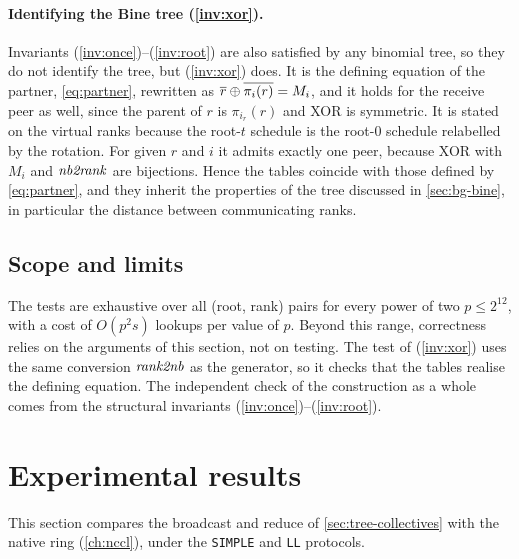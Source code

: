 \paragraph{Identifying the Bine tree (\ref{inv:xor}).}
Invariants (\ref{inv:once})--(\ref{inv:root}) are also satisfied by any binomial tree, so they do not identify the \bine{} tree, but (\ref{inv:xor}) does.
It is the defining equation of the partner, \cref{eq:partner}, rewritten as $\overline{r}\oplus\overline{\pi_i(r)}=M_i$, and it holds for the receive peer as well, since the parent of $r$ is $\pi_{i_r}(r)$ and XOR is symmetric.
It is stated on the virtual ranks because the root-$t$ schedule is the root-$0$ schedule relabelled by the rotation.
For given $r$ and $i$ it admits exactly one peer, because XOR with $M_i$ and $\mathit{nb2rank}$ are bijections.
Hence the tables coincide with those defined by \cref{eq:partner}, and they inherit the properties of the \bine{} tree discussed in \cref{sec:bg-bine}, in particular the distance between communicating ranks.

\subsection{Scope and limits}

The tests are exhaustive over all (root, rank) pairs for every power of two $p\le 2^{12}$, with a cost of $O(p^2 s)$ lookups per value of $p$.
Beyond this range, correctness relies on the arguments of this section, not on testing.
The test of (\ref{inv:xor}) uses the same conversion $\mathit{rank2nb}$ as the generator, so it checks that the tables realise the defining equation. The independent check of the construction as a whole comes from the structural invariants (\ref{inv:once})--(\ref{inv:root}).

\section{Experimental results}\label{sec:tree-results}

This section compares the \bine{} broadcast and reduce of \cref{sec:tree-collectives} with the native \nccl{} ring (\cref{ch:nccl}), under the \texttt{SIMPLE} and \texttt{LL} protocols.

